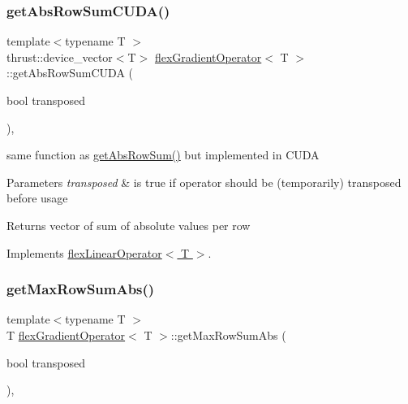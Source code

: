 \subsubsection{\texorpdfstring{get\+Abs\+Row\+Sum\+C\+U\+D\+A()}{getAbsRowSumCUDA()}}
{\footnotesize\ttfamily template$<$typename T $>$ \\
thrust\+::device\+\_\+vector$<$T$>$ \hyperlink{classflex_gradient_operator}{flex\+Gradient\+Operator}$<$ T $>$\+::get\+Abs\+Row\+Sum\+C\+U\+DA (\begin{DoxyParamCaption}\item[{bool}]{transposed }\end{DoxyParamCaption})\hspace{0.3cm}{\ttfamily [inline]}, {\ttfamily [virtual]}}



same function as \hyperlink{classflex_gradient_operator_a04950a1e57f7587b95824bfd82b35738}{get\+Abs\+Row\+Sum()} but implemented in C\+U\+DA 


\begin{DoxyParams}{Parameters}
{\em transposed} & is true if operator should be (temporarily) transposed before usage \\
\hline
\end{DoxyParams}
\begin{DoxyReturn}{Returns}
vector of sum of absolute values per row 
\end{DoxyReturn}


Implements \hyperlink{classflex_linear_operator_a0a0a431d43f4f9d36cbee0d31ba5a29b}{flex\+Linear\+Operator$<$ T $>$}.

\mbox{\label{classflex_gradient_operator_a6acb61ea8abf404d63be4574976391bb}} 
\subsubsection{\texorpdfstring{get\+Max\+Row\+Sum\+Abs()}{getMaxRowSumAbs()}}
{\footnotesize\ttfamily template$<$typename T $>$ \\
T \hyperlink{classflex_gradient_operator}{flex\+Gradient\+Operator}$<$ T $>$\+::get\+Max\+Row\+Sum\+Abs (\begin{DoxyParamCaption}\item[{bool}]{transposed }\end{DoxyParamCaption})\hspace{0.3cm}{\ttfamily [inline]}, {\ttfamily [virtual]}}




